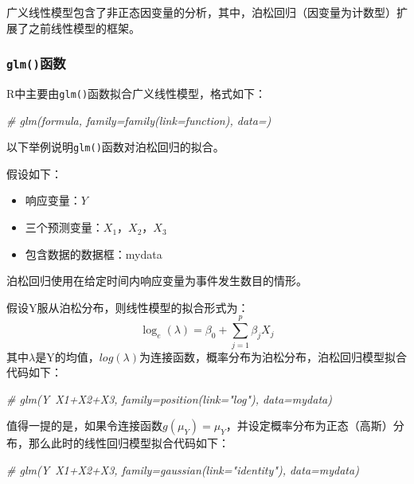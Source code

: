 \documentclass[
]{article}
\newenvironment{Shaded}{\begin{snugshade}}{\end{snugshade}}
\newcommand{\CommentTok}[1]{\textcolor[rgb]{0.56,0.35,0.01}{\textit{#1}}}
\providecommand{\tightlist}{%
  \setlength{\itemsep}{0pt}\setlength{\parskip}{0pt}}
\begin{document}
广义线性模型包含了非正态因变量的分析，其中，泊松回归（因变量为计数型）扩展了之前线性模型的框架。

\hypertarget{glmux51fdux6570}{%
\subsubsection{\texorpdfstring{\texttt{glm()}函数}{glm()函数}}\label{glmux51fdux6570}}

R中主要由\texttt{glm()}函数拟合广义线性模型，格式如下：

\begin{Shaded}
\begin{Highlighting}[]
\CommentTok{# glm(formula, family=family(link=function), data=)}
\end{Highlighting}
\end{Shaded}

以下举例说明\texttt{glm()}函数对泊松回归的拟合。

假设如下：

\begin{itemize}
\tightlist
\item
  响应变量：\(Y\)
\item
  三个预测变量：\(X_1，X_2，X_3\)
\item
  包含数据的数据框：mydata
\end{itemize}

泊松回归使用在给定时间内响应变量为事件发生数目的情形。

假设Y服从泊松分布，则线性模型的拟合形式为：
\[\log _{e}(\lambda)=\beta_{0}+\sum_{j=1}^{p} \beta_{j} X_{j}\]
其中\(\lambda\)是Y的均值，\(log(\lambda)\)为连接函数，概率分布为泊松分布，泊松回归模型拟合代码如下：

\begin{Shaded}
\begin{Highlighting}[]
\CommentTok{# glm(Y~X1+X2+X3, family=position(link="log"), data=mydata)}
\end{Highlighting}
\end{Shaded}

值得一提的是，如果令连接函数\(g\left(\mu_{Y}\right)=\mu_{Y}\)，并设定概率分布为正态（高斯）分布，那么此时的线性回归模型拟合代码如下：

\begin{Shaded}
\begin{Highlighting}[]
\CommentTok{# glm(Y~X1+X2+X3, family=gaussian(link="identity"), data=mydata)}
\end{Highlighting}
\end{Shaded}
\end{document}
